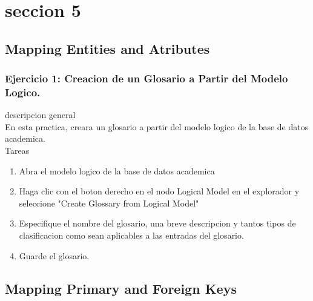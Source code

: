 \documentclass[12pt,letterpaper]{article}
\begin{document}
 \newpage
\section{seccion 5} 
\subsection{Mapping Entities and Atributes}
\subsubsection{Ejercicio 1: Creacion de un Glosario a Partir del Modelo Logico.} 
descripcion general  \\
En esta practica, creara un glosario a partir del modelo logico de la base de datos academica. \\

Tareas\\
\begin{enumerate}[1.]
    \item  Abra el modelo logico de la base de datos academica 
     
    \item Haga clic con el boton derecho en el nodo Logical Model en el explorador y seleccione "Create Glossary from Logical Model"
    
    \item Especifique el nombre del glosario, una breve descripcion y tantos tipos de clasificacion como sean aplicables a las entradas del glosario.
    
    \item Guarde el glosario.
    
		\end{enumerate}












 \newpage
\subsection{Mapping Primary and Foreign Keys}
\end{document}
